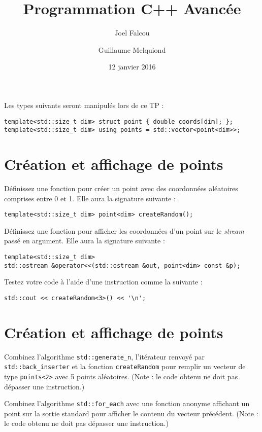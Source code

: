 \documentclass[a4paper]{article}
\title{\vspace{-2cm}Programmation C++ Avancée}
\author{Joel Falcou \and Guillaume Melquiond}
\date{12 janvier 2016}
\begin{document}
\maketitle

Les types suivants seront manipulés lors de ce TP :
\begin{lstlisting}
template<std::size_t dim> struct point { double coords[dim]; };
template<std::size_t dim> using points = std::vector<point<dim>>;
\end{lstlisting}

\section{Création et affichage de points}

Définissez une fonction pour créer un point avec des coordonnées
aléatoires comprises entre 0 et 1. Elle aura la signature suivante :
\begin{lstlisting}
template<std::size_t dim> point<dim> createRandom();
\end{lstlisting}

Définissez une fonction pour afficher les coordonnées d'un point sur le
\emph{stream} passé en argument. Elle aura la signature suivante :
\begin{lstlisting}
template<std::size_t dim>
std::ostream &operator<<(std::ostream &out, point<dim> const &p);
\end{lstlisting}

Testez votre code à l'aide d'une instruction comme la suivante :
\begin{lstlisting}
std::cout << createRandom<3>() << '\n';
\end{lstlisting}

\section{Création et affichage de points}

Combinez l'algorithme \lstinline|std::generate_n|, l'itérateur renvoyé
par \lstinline|std::back_inserter| et la fonction
\lstinline|createRandom| pour remplir un vecteur de type
\lstinline|points<2>| avec 5 points aléatoires. (Note : le code obtenu ne
doit pas dépasser une instruction.)

Combinez l'algorithme \lstinline|std::for_each| avec une fonction anonyme
affichant un point sur la sortie standard pour afficher le contenu du
vecteur précédent. (Note : le code obtenu ne doit pas dépasser une
instruction.)
\end{document}
